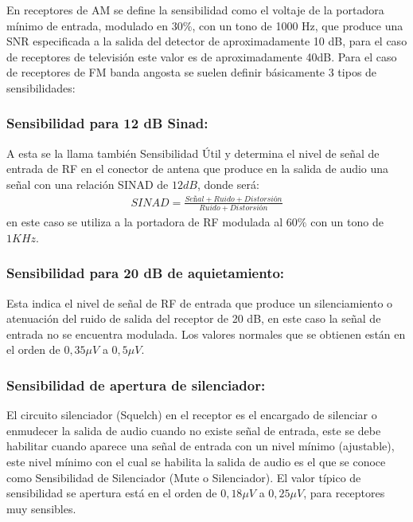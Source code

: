 \documentclass[letterpaper,10pt,spanish]{sphinxmanual}
\begin{document}
En receptores de AM se define la sensibilidad como el voltaje de la portadora mínimo de entrada, modulado en \(30\%\), con un tono de 1000 Hz, que produce una SNR especificada a la salida del detector de aproximadamente 10 dB, para el caso de receptores de televisión este valor es de aproximadamente 40dB. Para el caso de receptores de FM banda angosta se suelen definir básicamente 3 tipos de sensibilidades:


\subsubsection{Sensibilidad para 12 dB Sinad:}
\label{\detokenize{introduccion/sistemas:Sensibilidad-para-12-dB-Sinad:}}
A esta se la llama también Sensibilidad Útil y determina el nivel de señal de entrada de RF en el conector de antena que produce en la salida de audio una señal con una relación SINAD de \(12 dB\), donde será:
\begin{equation*}
\begin{split}SINAD = \frac{Señal + Ruido + Distorsión}{Ruido + Distorsión}\end{split}
\end{equation*}
en este caso se utiliza a la portadora de RF modulada al \(60 \%\) con un tono de \(1 KHz\).


\subsubsection{Sensibilidad para 20 dB de aquietamiento:}
\label{\detokenize{introduccion/sistemas:Sensibilidad-para-20-dB-de-aquietamiento:}}
Esta indica el nivel de señal de RF de entrada que produce un silenciamiento o atenuación del ruido de salida del receptor de 20 dB, en este caso la señal de entrada no se encuentra modulada. Los valores normales que se obtienen están en el orden de \(0,35 \mu V\) a \(0,5 \mu V\).


\subsubsection{Sensibilidad de apertura de silenciador:}
\label{\detokenize{introduccion/sistemas:Sensibilidad-de-apertura-de-silenciador:}}
El circuito silenciador (Squelch) en el receptor es el encargado de silenciar o enmudecer la salida de audio cuando no existe señal de entrada, este se debe habilitar cuando aparece una señal de entrada con un nivel mínimo (ajustable), este nivel mínimo con el cual se habilita la salida de audio es el que se conoce como Sensibilidad de Silenciador (Mute o Silenciador). El valor típico de sensibilidad se apertura está en el orden de \(0,18 \mu V\) a \(0,25 \mu V\), para receptores muy
sensibles.
\end{document}
